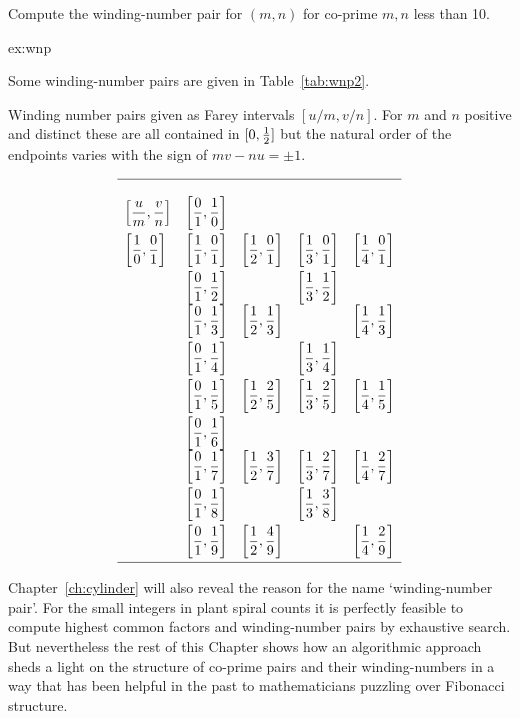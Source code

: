 \begin{jExercise}\label{ex:wnp}
	Compute the winding-number pair for $(m,n)$ for co-prime $m,n$ less than 10. 
\end{jExercise}
\begin{jAnswer}{ex:wnp}{
	Some winding-number pairs are given in Table~\ref{tab:wnp2}.
	\begin{table}
	\caption{Winding number pairs given as Farey intervals $[u/m,v/n]$. For $m$ and $n$ positive and distinct these are all contained in $[0,\textstyle{\frac{1}{2}}]$ but the natural order of the endpoints varies with the sign of $mv-nu=\pm 1$.}
\label{tab:wnp2}
	\begin{equation*}
		\begin{array}{lllll}
			\hline
			\\
			\left[\displaystyle\frac{u}{m},\frac{v}{n}\right]
			&\left[\displaystyle\frac{0}{1},\frac{1}{0}\right]&   &  &   \\[2ex]
			\left[\displaystyle\frac{ 1}{0},\frac{0}{1}\right] &  \left[\displaystyle\frac{1}{1},\frac{0}{1}\right]  &  \left[\displaystyle\frac{1}{2},\frac{0}{1}\right]  & \left[\displaystyle\frac{1}{3},\frac{0}{1}\right]& \left[\displaystyle\frac{1}{4},\frac{0}{1}\right] \\[2ex]
			&  \left[\displaystyle\frac{0}{1},\frac{1}{2}\right]&  & \left[\displaystyle\frac{1}{3},\frac{1}{2}\right] &  \\
			&  \left[\displaystyle\frac{0}{1},\frac{1}{3}\right] & \left[\displaystyle\frac{1}{2},\frac{1}{3}\right] &  & \left[\displaystyle\frac{1}{4},\frac{1}{3}\right] \\[2ex]
			&  \left[\displaystyle\frac{0}{1},\frac{1}{4}\right] &  & \left[\displaystyle\frac{1}{3},\frac{1}{4}\right] & \\[2ex]
			&  \left[\displaystyle\frac{0}{1},\frac{1}{5}\right] &\left[\displaystyle\frac{1}{2},\frac{2}{5}\right] & \left[\displaystyle\frac{1}{3},\frac{2}{5}\right] &\left[\displaystyle\frac{1}{4},\frac{1}{5}\right] \\[2ex]
			&  \left[\displaystyle\frac{0}{1},\frac{1}{6}\right] &  &  &  \\
			&  \left[\displaystyle\frac{0}{1},\frac{1}{7}\right] &\left[\displaystyle\frac{1}{2},\frac{3}{7}\right]& \left[\displaystyle\frac{1}{3},\frac{2}{7}\right] & \left[\displaystyle\frac{1}{4},\frac{2}{7}\right]  \\[2ex]
			&  \left[\displaystyle\frac{0}{1},\frac{1}{8}\right] &  & \left[\displaystyle\frac{1}{3},\frac{3}{8}\right] &  \\[2ex]
			&  \left[\displaystyle\frac{0}{1},\frac{1}{9}\right] & \left[\displaystyle\frac{1}{2},\frac{4}{9}\right] &  & \left[\displaystyle\frac{1}{4},\frac{2}{9}\right]  \\[2ex]
			\hline
		\end{array}
	\end{equation*}
		\end{table}
}\end{jAnswer}
Chapter~\ref{ch:cylinder} will also reveal the reason for the name `winding-number pair'. 
For the small integers in plant spiral counts it is perfectly feasible to compute highest common factors and winding-number pairs by exhaustive search. But nevertheless the rest of this Chapter shows how an algorithmic approach sheds a light on the structure of co-prime pairs and their winding-numbers in a way that has been helpful in the past to mathematicians puzzling over Fibonacci structure. 


